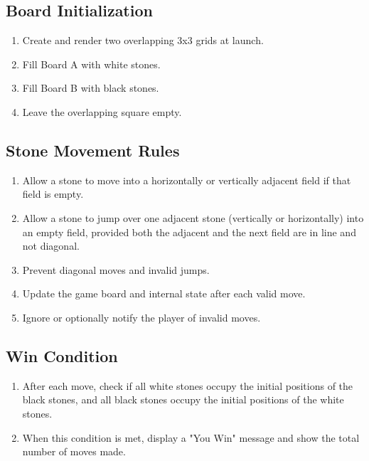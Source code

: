 \documentclass[11.5pt, oneside]{scrartcl}
\begin{document}
	\subsection{Board Initialization}
	\begin{enumerate}[label=\textbf{FR\arabic*}, labelwidth=3em, labelsep=0.5em, leftmargin=4em, align=left, start=1]
		\itemsep0pt
		\item Create and render two overlapping 3x3 grids at launch.
		\item Fill Board A with white stones.
		\item Fill Board B with black stones.
		\item Leave the overlapping square empty.
	\end{enumerate}
	
	\subsection{Stone Movement Rules}
	\begin{enumerate}[label=\textbf{FR\arabic*}, labelwidth=3em, labelsep=0.5em, leftmargin=4em, align=left, start=5]
		\itemsep0pt
		\item Allow a stone to move into a horizontally or vertically adjacent field if that field is empty.
		\item Allow a stone to jump over one adjacent stone (vertically or horizontally) into an empty field, provided both the adjacent and the next field are in line and not diagonal.
		\item Prevent diagonal moves and invalid jumps.
		\item Update the game board and internal state after each valid move.
		\item Ignore or optionally notify the player of invalid moves.
	\end{enumerate}
	
	\subsection{Win Condition}
	\begin{enumerate}[label=\textbf{FR\arabic*}, labelwidth=3em, labelsep=0.5em, leftmargin=4em, align=left, start=10]
		\itemsep0pt
		\item After each move, check if all white stones occupy the initial positions of the black stones, and all black stones occupy the initial positions of the white stones.
		\item When this condition is met, display a "You Win" message and show the total number of moves made.
	\end{enumerate}
	
\end{document}

